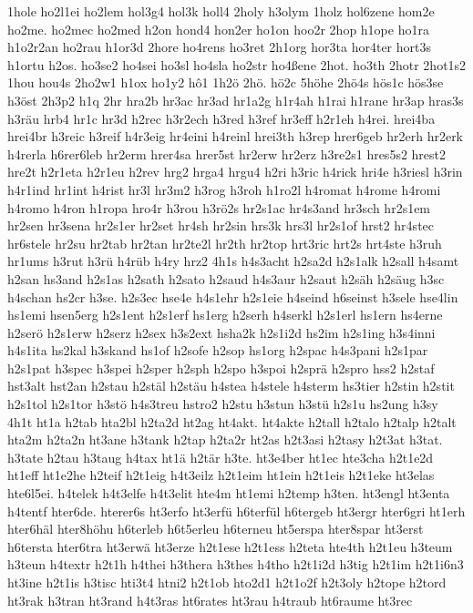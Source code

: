 {1hole
ho2l1ei
ho2lem
hol3g4
hol3k
holl4
2holy
h3olym
1holz
hol6zene
hom2e
ho2me.
ho2mec
ho2med
h2on
hond4
hon2er
ho1on
hoo2r
2hop
h1ope
ho1ra
h1o2r2an
ho2rau
h1or3d
2hore
ho4rens
ho3ret
2h1org
hor3ta
hor4ter
hort3s
h1ortu
h2os.
ho3se2
ho4sei
ho3sl
ho4sla
ho2str
ho4ßene
2hot.
ho3th
2hotr
2hot1s2
1hou
hou4s
2ho2w1
h1ox
ho1y2
hô1
1h2ö
2hö.
hö2c
5höhe
2hö4s
hös1c
hös3se
h3öst
2h3p2
h1q
2hr
hra2b
hr3ac
hr3ad
hr1a2g
h1r4ah
h1rai
h1rane
hr3ap
hras3s
h3räu
hrb4
hr1c
hr3d
h2rec
h3r2ech
h3red
h3ref
hr3eff
h2r1eh
h4rei.
hrei4ba
hrei4br
h3reic
h3reif
h4r3eig
hr4eini
h4reinl
hrei3th
h3rep
hrer6geb
hr2erh
hr2erk
h4rerla
h6rer6leb
hr2erm
hrer4sa
hrer5st
hr2erw
hr2erz
h3re2s1
hres5s2
hrest2
hre2t
h2r1eta
h2r1eu
h2rev
hrg2
hrga4
hrgu4
h2ri
h3ric
h4rick
hri4e
h3riesl
h3rin
h4r1ind
hr1int
h4rist
hr3l
hr3m2
h3rog
h3roh
h1ro2l
h4romat
h4rome
h4romi
h4romo
h4ron
h1ropa
hro4r
h3rou
h3rö2s
hr2s1ac
hr4s3and
hr3sch
hr2s1em
hr2sen
hr3sena
hr2s1er
hr2set
hr4sh
hr2sin
hrs3k
hrs3l
hr2s1of
hrst2
hr4stec
hr6stele
hr2su
hr2tab
hr2tan
hr2te2l
hr2th
hr2top
hrt3ric
hrt2s
hrt4ste
h3ruh
hr1ums
h3rut
h3rü
h4rüb
h4ry
hrz2
4h1s
h4s3acht
h2sa2d
h2s1alk
h2sall
h4samt
h2san
hs3and
h2s1as
h2sath
h2sato
h2saud
h4s3aur
h2saut
h2säh
h2säug
h3sc
h4schan
hs2cr
h3se.
h2s3ec
hse4e
h4s1ehr
h2s1eie
h4seind
h6seinst
h3sele
hse4lin
hs1emi
hsen5erg
h2s1ent
h2s1erf
hs1erg
h2serh
h4serkl
h2s1erl
hs1ern
hs4erne
h2serö
h2s1erw
h2serz
h2sex
h3s2ext
hsha2k
h2s1i2d
hs2im
h2s1ing
h3s4inni
h4s1ita
hs2kal
h3skand
hs1of
h2sofe
h2sop
hs1org
h2spac
h4s3pani
h2s1par
h2s1pat
h3spec
h3spei
h2sper
h2sph
h2spo
h3spoi
h2sprä
h2spro
hss2
h2staf
hst3alt
hst2an
h2stau
h2stäl
h2stäu
h4stea
h4stele
h4sterm
hs3tier
h2stin
h2stit
h2s1tol
h2s1tor
h3stö
h4s3treu
hstro2
h2stu
h3stun
h3stü
h2s1u
hs2ung
h3sy
4h1t
ht1a
h2tab
hta2bl
h2ta2d
ht2ag
ht4akt.
ht4akte
h2tall
h2talo
h2talp
h2talt
hta2m
h2ta2n
ht3ane
h3tank
h2tap
h2ta2r
ht2as
h2t3asi
h2tasy
h2t3at
h3tat.
h3tate
h2tau
h3taug
h4tax
ht1ä
h2tär
h3te.
ht3e4ber
ht1ec
hte3cha
h2t1e2d
ht1eff
ht1e2he
h2teif
h2t1eig
h4t3eilz
h2t1eim
ht1ein
h2t1eis
h2t1eke
ht3elas
hte6l5ei.
h4telek
h4t3elfe
h4t3elit
hte4m
ht1emi
h2temp
h3ten.
ht3engl
ht3enta
h4tentf
hter6de.
hterer6s
ht3erfo
ht3erfü
h6terfül
h6tergeb
ht3ergr
hter6gri
ht1erh
hter6häl
hter8höhu
h6terleb
h6t5erleu
h6terneu
ht5erspa
hter8spar
ht3erst
h6tersta
hter6tra
ht3erwä
ht3erze
h2t1ese
h2t1ess
h2teta
hte4th
h2t1eu
h3teum
h3teun
h4textr
h2t1h
h4thei
h3thera
h3thes
h4tho
h2t1i2d
h3tig
h2t1im
h2t1i6n3
ht3ine
h2t1is
h3tisc
hti3t4
htni2
h2t1ob
hto2d1
h2t1o2f
h2t3oly
h2tope
h2tord
ht3rak
h3tran
ht3rand
h4t3ras
ht6rates
ht3rau
h4traub
ht6raume
ht3rec
}

